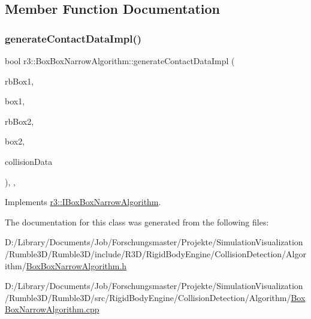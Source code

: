\subsection{Member Function Documentation}
\mbox{\label{classr3_1_1_box_box_narrow_algorithm_a200098ad4e6e2381f58856002a2d5dec}} 
\subsubsection{\texorpdfstring{generate\+Contact\+Data\+Impl()}{generateContactDataImpl()}}
{\footnotesize\ttfamily bool r3\+::\+Box\+Box\+Narrow\+Algorithm\+::generate\+Contact\+Data\+Impl (\begin{DoxyParamCaption}\item[{\mbox{\hyperlink{classr3_1_1_rigid_body}{Rigid\+Body}} $\ast$}]{rb\+Box1,  }\item[{\mbox{\hyperlink{classr3_1_1_collision_box}{Collision\+Box}} $\ast$}]{box1,  }\item[{\mbox{\hyperlink{classr3_1_1_rigid_body}{Rigid\+Body}} $\ast$}]{rb\+Box2,  }\item[{\mbox{\hyperlink{classr3_1_1_collision_box}{Collision\+Box}} $\ast$}]{box2,  }\item[{\mbox{\hyperlink{classr3_1_1_collision_data}{Collision\+Data}} \&}]{collision\+Data }\end{DoxyParamCaption})\hspace{0.3cm}{\ttfamily [override]}, {\ttfamily [protected]}, {\ttfamily [virtual]}}



Implements \mbox{\hyperlink{classr3_1_1_i_box_box_narrow_algorithm_abc15898100b5ed0537e4c6ccc6610069}{r3\+::\+I\+Box\+Box\+Narrow\+Algorithm}}.



The documentation for this class was generated from the following files\+:\begin{DoxyCompactItemize}
\item 
D\+:/\+Library/\+Documents/\+Job/\+Forschungsmaster/\+Projekte/\+Simulation\+Visualization/\+Rumble3\+D/\+Rumble3\+D/include/\+R3\+D/\+Rigid\+Body\+Engine/\+Collision\+Detection/\+Algorithm/\mbox{\hyperlink{_box_box_narrow_algorithm_8h}{Box\+Box\+Narrow\+Algorithm.\+h}}\item 
D\+:/\+Library/\+Documents/\+Job/\+Forschungsmaster/\+Projekte/\+Simulation\+Visualization/\+Rumble3\+D/\+Rumble3\+D/src/\+Rigid\+Body\+Engine/\+Collision\+Detection/\+Algorithm/\mbox{\hyperlink{_box_box_narrow_algorithm_8cpp}{Box\+Box\+Narrow\+Algorithm.\+cpp}}\end{DoxyCompactItemize}
